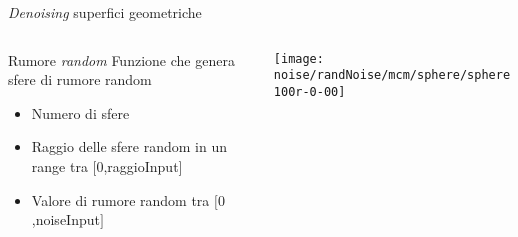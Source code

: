 \begin{frame}{\emph{Denoising} superfici geometriche}
  \begin{columns}[T]
    \begin{column}{4cm}
      \begin{block}{Rumore \emph{random}}
        Funzione che genera sfere di rumore random
        \begin{itemize}
        \item Numero di sfere
        \item Raggio delle sfere random in un range tra $[0$,raggioInput$]$ 
        \item Valore di rumore random tra $[0$,noiseInput$]$
        \end{itemize}
      \end{block}
    \end{column}
   \begin{column}{6cm}
     \texttt{[image: noise/randNoise/mcm/sphere/sphere100r-0-00]}
   \end{column}
  \end{columns}
\end{frame}

